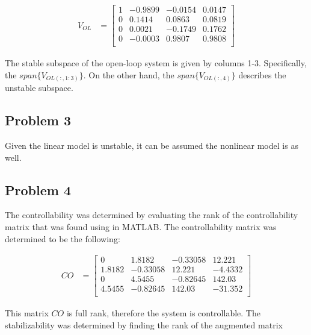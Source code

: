 \documentclass[12pt, letterpaper, onecolumn]{article}
\begin{document}
\begin{equation*}
    \begin{split}
        V_{OL} & =
        \begin{bmatrix}
            1 & -0.9899 & -0.0154 & 0.0147 \\
            0 & 0.1414  & 0.0863  & 0.0819 \\
            0 & 0.0021  & -0.1749 & 0.1762 \\
            0 & -0.0003 & 0.9807  & 0.9808 \\
        \end{bmatrix}
    \end{split}
\end{equation*}

The stable subspace of the open-loop system is given by columns 1-3. Specifically, the $span\{V_{OL(:,1:3)}\}$. On the other hand, the  $span\{V_{OL(:,4)}\}$ describes the unstable subspace.

\subsection*{Problem 3}
Given the linear model is unstable, it can be assumed the nonlinear model is as well.
\subsection*{Problem 4}
The controllability was determined by evaluating the rank of the controllability matrix that was found using  in MATLAB\@. The controllability matrix was determined to be the following:


\begin{equation*}
    \begin{split}
        CO & =
        \begin{bmatrix}
            0      & 1.8182   & -0.33058 & 12.221  \\
            1.8182 & -0.33058 & 12.221   & -4.4332 \\
            0      & 4.5455   & -0.82645 & 142.03  \\
            4.5455 & -0.82645 & 142.03   & -31.352 \\
        \end{bmatrix}
    \end{split}
\end{equation*}

This matrix $CO$ is full rank, therefore the system is controllable. The stabilizability was determined by finding the rank of the augmented matrix
\end{document}
